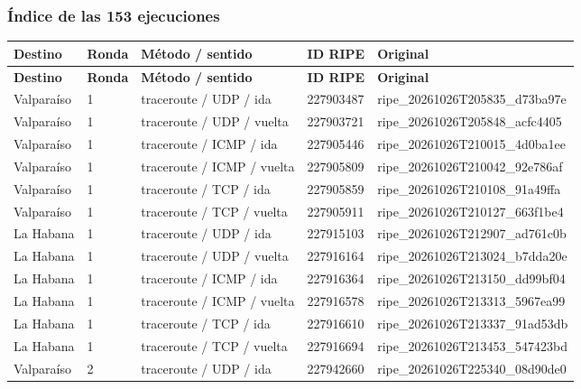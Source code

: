 \subsubsection{Índice de las 153 ejecuciones}
\begingroup
\fontsize{9}{11}\selectfont
\addtocounter{table}{-1}
\begin{longtable}{p{2cm}p{1.15cm}p{4.2cm}p{2.2cm}p{4.95cm}}
\toprule
\textbf{Destino} & \textbf{Ronda} & \textbf{Método / sentido} & \textbf{ID RIPE} & \textbf{Original} \\ \midrule
\endfirsthead
\toprule
\textbf{Destino} & \textbf{Ronda} & \textbf{Método / sentido} & \textbf{ID RIPE} & \textbf{Original} \\ \midrule
\endhead
Valparaíso & 1 & traceroute / UDP / ida & 227903487 & ripe\_\allowbreak{}20261026T205835\_\allowbreak{}d73ba97e \\
Valparaíso & 1 & traceroute / UDP / vuelta & 227903721 & ripe\_\allowbreak{}20261026T205848\_\allowbreak{}acfc4405 \\
Valparaíso & 1 & traceroute / ICMP / ida & 227905446 & ripe\_\allowbreak{}20261026T210015\_\allowbreak{}4d0ba1ee \\
Valparaíso & 1 & traceroute / ICMP / vuelta & 227905809 & ripe\_\allowbreak{}20261026T210042\_\allowbreak{}92e786af \\
Valparaíso & 1 & traceroute / TCP / ida & 227905859 & ripe\_\allowbreak{}20261026T210108\_\allowbreak{}91a49ffa \\
Valparaíso & 1 & traceroute / TCP / vuelta & 227905911 & ripe\_\allowbreak{}20261026T210127\_\allowbreak{}663f1be4 \\
La Habana & 1 & traceroute / UDP / ida & 227915103 & ripe\_\allowbreak{}20261026T212907\_\allowbreak{}ad761c0b \\
La Habana & 1 & traceroute / UDP / vuelta & 227916164 & ripe\_\allowbreak{}20261026T213024\_\allowbreak{}b7dda20e \\
La Habana & 1 & traceroute / ICMP / ida & 227916364 & ripe\_\allowbreak{}20261026T213150\_\allowbreak{}dd99bf04 \\
La Habana & 1 & traceroute / ICMP / vuelta & 227916578 & ripe\_\allowbreak{}20261026T213313\_\allowbreak{}5967ea99 \\
La Habana & 1 & traceroute / TCP / ida & 227916610 & ripe\_\allowbreak{}20261026T213337\_\allowbreak{}91ad53db \\
La Habana & 1 & traceroute / TCP / vuelta & 227916694 & ripe\_\allowbreak{}20261026T213453\_\allowbreak{}547423bd \\
Valparaíso & 2 & traceroute / UDP / ida & 227942660 & ripe\_\allowbreak{}20261026T225340\_\allowbreak{}08d90de0 \\

\end{longtable}
